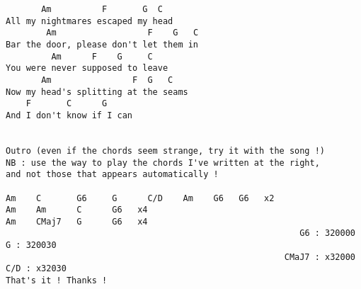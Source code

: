 \documentclass[leqno]{memoir}
\begin{document}
\begin{verbatim}
       Am          F       G  C  
All my nightmares escaped my head
        Am                  F    G   C
Bar the door, please don't let them in
         Am      F    G     C  
You were never supposed to leave
       Am                F  G   C 
Now my head's splitting at the seams
    F       C      G
And I don't know if I can     
     

Outro (even if the chords seem strange, try it with the song !) 
NB : use the way to play the chords I've written at the right,
and not those that appears automatically !
                                 
Am    C       G6     G      C/D    Am    G6   G6   x2                      
Am    Am      C      G6   x4                            
Am    CMaj7   G      G6   x4                       
                                                          G6 : 320000       G : 320030
                                                       CMaJ7 : x32000     C/D : x32030
That's it ! Thanks !

\end{verbatim}
\newpage
\end{document}
